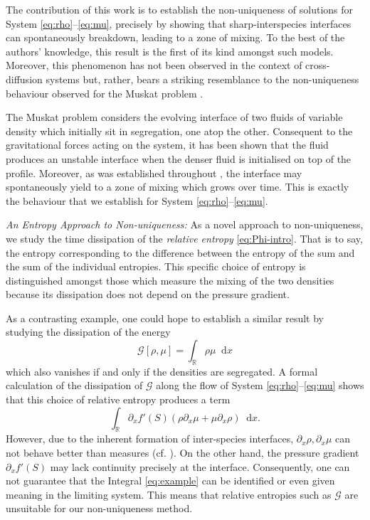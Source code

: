 \documentclass[a4paper,twosided, 11pt]{article}
\newcommand{\R}{\mathbb{R}}
\theoremstyle{plain}
\theoremstyle{remark}
\newcommand{\diff}{\mathop{} \mathrm{d}}
\numberwithin{equation}{section}
\begin{document}
\medskip 

The contribution of this work is to establish the non-uniqueness of solutions for System \eqref{eq:rho}--\eqref{eq:mu}, precisely by showing that sharp-interspecies interfaces can spontaneously breakdown, leading to a zone of mixing. 
To the best of the authors' knowledge, this result is the first of its kind amongst such models.
Moreover, this phenomenon has not been observed in the context of cross-diffusion systems but, rather, bears a striking resemblance to the non-uniqueness behaviour observed for the Muskat problem \cite{Muskat34}.


\medskip 

The Muskat problem considers the evolving interface of two fluids of variable density which initially sit in segregation, one atop the other. 
Consequent to the gravitational forces acting on the system, it has been shown that the fluid produces an unstable interface when the denser fluid is initialised on top of the profile. 
Moreover, as was established throughout \cite{Otto99,CastroCordoba21,noisetteszekelyhidi21,ForsterSzekelyhidi18}, the interface may spontaneously yield to a zone of mixing which grows over time. This is exactly the behaviour that we establish for System \eqref{eq:rho}--\eqref{eq:mu}.
  
\medskip 

\emph{An Entropy Approach to Non-uniqueness:} 
As a novel approach to non-uniqueness, we study the time dissipation of the \textit{relative entropy} \eqref{eq:Phi-intro}.
That is to say, the entropy corresponding to the difference between the entropy of the sum and the sum of the individual entropies.  
This specific choice of entropy is distinguished amongst those which measure the mixing of the two densities because its dissipation does not depend on the pressure gradient. 

\medskip 

As a contrasting example, one could hope to establish a similar result by studying the dissipation of the energy 
\[
\mathcal{G}[\rho,\mu] = \int_{\R} \rho \mu \diff x
\]
which also vanishes if and only if the densities are segregated.
A formal calculation of the dissipation of $\mathcal{G}$ along the flow of System \eqref{eq:rho}--\eqref{eq:mu} shows that this choice of relative entropy produces a term 
\begin{equation}\label{eq:example}
    \int_{\R} \partial_x f'(S) \left(\rho \partial_x \mu + \mu \partial_x \rho\right) \diff x.
\end{equation}
However, due to the inherent formation of inter-species interfaces, $\partial_x \rho, \partial_x \mu$ can not behave better than measures (cf. \cite{2025arXiv250418484M}). 
On the other hand, the pressure gradient $\partial_x f'(S)$ may lack continuity precisely at the interface. 
Consequently, one can not guarantee that the Integral \eqref{eq:example} can be identified or even given meaning in the limiting system.
This means that relative entropies such as $\mathcal{G}$ are unsuitable for our non-uniqueness method.
\end{document}
